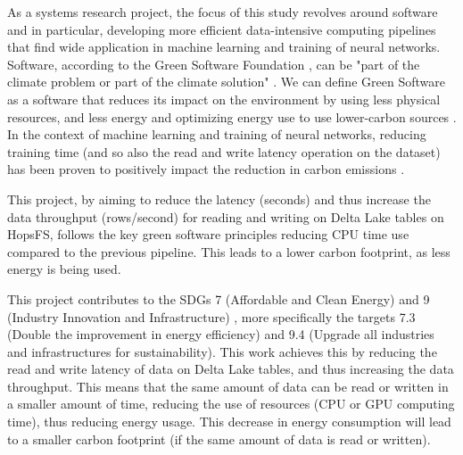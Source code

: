 As a systems research project, the focus of this study revolves around software and in particular, developing more efficient data-intensive computing pipelines that find wide application in machine learning and training of neural networks. Software, according to the Green Software Foundation \cite{GreenSoftwareFoundation}, can be "part of the climate problem or part of the climate solution" \cite{WhatGreenSoftware2021}. We can define Green Software as a software that reduces its impact on the environment by using less physical resources, and less energy and optimizing energy use to use lower-carbon sources \cite{WhatGreenSoftware2021}. In the context of machine learning and training of neural networks, reducing training time (and so also the read and write latency operation on the dataset) has been proven to positively impact the reduction in carbon emissions \cite{pattersonCarbonEmissionsLarge2021,pattersonCarbonFootprintMachine2022}.

This project, by aiming to reduce the latency (seconds) and thus increase the data throughput (rows/second) for reading and writing on Delta Lake tables on \gls{HopsFS}, follows the key green software principles reducing \gls{CPU} time use compared to the previous pipeline. This leads to a lower carbon footprint, as less energy is being used.

This project contributes to the \glspl{SDG} 7 (Affordable and Clean Energy) and 9 (Industry Innovation and Infrastructure) \cite{SustainableDevelopment}, more specifically the targets 7.3 (Double the improvement in energy efficiency) and 9.4 (Upgrade all industries and infrastructures for sustainability). This work achieves this by reducing the read and write latency of data on Delta Lake tables, and thus increasing the data throughput. This means that the same amount of data can be read or written in a smaller amount of time, reducing the use of resources (\gls{CPU} or \gls{GPU} computing time), thus reducing energy usage. This decrease in energy consumption will lead to a smaller carbon footprint (if the same amount of data is read or written). 

